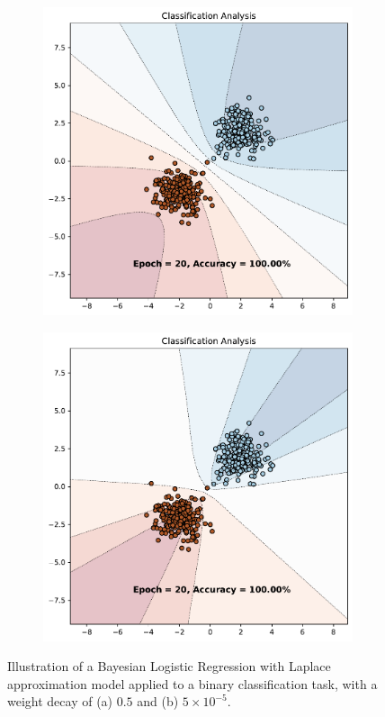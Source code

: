 \begin{figure}[H]
    \centering
    \begin{subfigure}{0.45\textwidth}
        \includegraphics[width=\textwidth]{laplace_approx_0.5.pdf}
        \caption{}
        \label{subfig:weight_decay_high}
    \end{subfigure}%
    \begin{subfigure}{0.45\textwidth}
        \includegraphics[width=\textwidth]{laplace_approx_5e-05.pdf}
        \caption{}
        \label{subfig:weight_decay_low}
    \end{subfigure}%
    \caption{Illustration of a Bayesian Logistic Regression with Laplace approximation model applied to a binary classification task, with a weight decay of (a) $0.5$ and (b) $5 \times 10^{-5}$.}
    \label{fig:weight_decay}
\end{figure}

